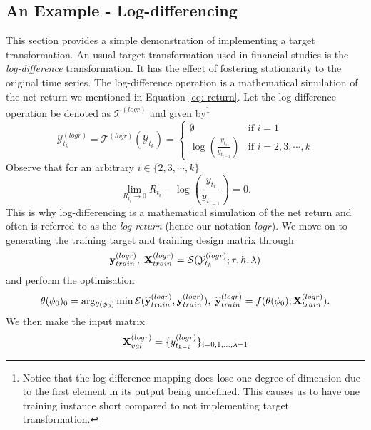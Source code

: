 \subsection{An Example - Log-differencing}\label{subsec: log-diff transformation}
This section provides a simple demonstration of implementing a target transformation. An usual target transformation used in financial studies is the \textit{log-difference} transformation. It has the effect of fostering stationarity to the original time series. The log-difference operation is a mathematical simulation of the net return we mentioned in Equation \ref{eq: return}. Let the log-difference operation be denoted as $\mathcal{T}^{(logr)}$ and given by\footnote{Notice that the log-difference mapping does lose one degree of dimension due to the first element in its output being undefined. This causes us to have one training instance short compared to not implementing target transformation.}
\begin{equation*}
    \mathcal{Y}^{(logr)}_{t_k} = \mathcal{T}^{(logr)}(\mathcal{Y}_{t_k}) = \begin{cases}
        \emptyset                  &\text{if $i = 1$} \\
        \log(\frac{y_{t_i}}{y_{t_{i-1}}})  &\text{if $i = 2, 3, \cdots, k$}
    \end{cases}
\end{equation*}
Observe that for an arbitrary $i \in \{2, 3, \cdots, k \}$
\begin{equation*}
    \lim_{R_{t_i} \rightarrow 0}{R_{t_i} - \log(\frac{y_{t_i}}{y_{t_{i-1}}}) = 0}.
\end{equation*}
This is why log-differencing is a mathematical simulation of the net return and often is referred to as the \textit{log return} (hence our notation $logr$). We move on to generating the training target and training design matrix through
\begin{equation*}
    \mathbf{y}^{(logr)}_{train}, \; \mathbf{X}^{(logr)}_{train} = \mathcal{S}(\mathcal{Y}^{(logr)}_{t_k}; \tau, h, \lambda)
\end{equation*}
and perform the optimisation
\begin{equation*}
    \theta(\phi_0)_0 = \arg_{\theta(\phi_0)} \min \mathcal{E}(\widehat{\mathbf{y}}^{(logr)}_{train}, \mathbf{y}^{(logr)}_{train}), \; \widehat{\mathbf{y}}^{(logr)}_{train} = f(\theta(\phi_0); \mathbf{X}^{(logr)}_{train}).
\end{equation*}
We then make the input matrix
\begin{equation*}
    \mathbf{X}^{(logr)}_{val} = \{y^{(logr)}_{t_{k-i}} \}_{i = 0, 1, \ldots, \lambda-1}
\end{equation*}

